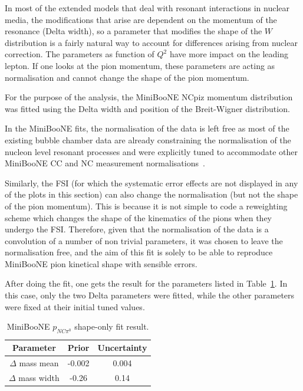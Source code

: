 In most of the extended models that deal with resonant interactions in
nuclear media, the modifications that arise are dependent on the
momentum of the resonance (Delta width), so a parameter that modifies
the shape of the $W$ distribution is a fairly natural way to account
for differences arising from nuclear correction. The parameters as
function of $Q^2$ have more impact on the leading lepton. If one looks
at the pion momentum, these parameters are acting as normalisation and
cannot change the shape of the pion momentum.

For the purpose of the analysis, the \Gls{MiniBooNE} \Gls{NC}\gls{piz}
momentum distribution~\cite{AguilarArevalo:2009ww} was fitted using
the Delta width and position of the Breit-Wigner distribution.

In the \Gls{MiniBooNE} fits, the normalisation of the data is left
free as most of the existing bubble chamber data are already
constraining the normalisation of the nucleon level resonant processes
and were explicitly tuned to accommodate other \Gls{MiniBooNE}
\Gls{CC} and \Gls{NC} measurement normalisations~\cite{TN315}.

Similarly, the \Gls{FSI} (for which the systematic error effects are
not displayed in any of the plots in this section) can also change the
normalisation (but not the shape of the pion momentum). This is
because it is not simple to code a reweighting scheme which changes
the shape of the kinematics of the pions when they undergo the
\Gls{FSI}. Therefore, given that the normalisation of the data is a
convolution of a number of non trivial parameters, it was chosen to
leave the normalisation free, and the aim of this fit is solely to be
able to reproduce \Gls{MiniBooNE} pion kinetical shape with sensible
errors.

After doing the fit, one gets the result for the parameters listed in
Table~\ref{tab:fitresult}. In this case, only the two Delta parameters
were fitted, while the other parameters were fixed at their initial
tuned values.

\begin{table}[ht]
  \begin{adjustbox}{center}
    \begin{tabular}{ccc}
      \toprule
      Parameter & Prior & Uncertainty \\
      \midrule
      $\Delta$ mass mean  & -0.002 & 0.004 \\
      $\Delta$ mass width & -0.26  & 0.14  \\
      \bottomrule
    \end{tabular}
  \end{adjustbox}
  \caption[MiniBooNE $p_{NC\pi^{0}}$ shape-only fit
  result]{\Gls{MiniBooNE} $p_{NC\pi^{0}}$ shape-only fit result.}
  \label{tab:fitresult}
\end{table}

